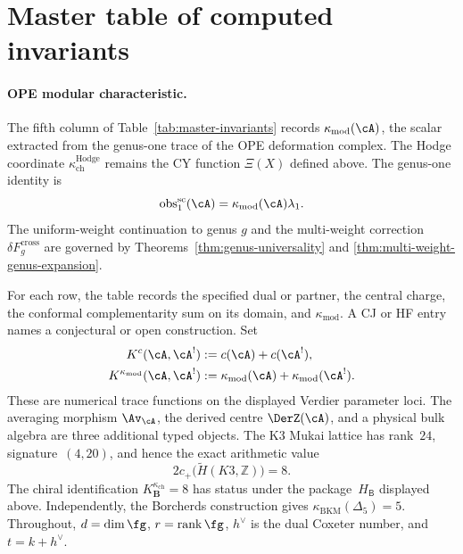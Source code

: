 \section*{Master table of computed invariants}
\label{sec:master-table}

\paragraph{OPE modular characteristic.}
The fifth column of Table~\ref{tab:master-invariants} records
\(\kappa_{\mathrm{mod}}(\cA)\), the scalar extracted from the
genus-one trace of the OPE deformation complex.  The Hodge coordinate
\(\kappa_{\mathrm{ch}}^{\mathrm{Hodge}}\) remains the CY function
\(\Xi(X)\) defined above.  The genus-one identity is
\[
\operatorname{obs}^{\mathrm{sc}}_1(\cA)
=\kappa_{\mathrm{mod}}(\cA)\lambda_1.
\]
The uniform-weight continuation to genus \(g\) and the multi-weight
correction \(\delta F_g^{\mathrm{cross}}\) are governed by
Theorems~\ref{thm:genus-universality} and
\ref{thm:multi-weight-genus-expansion}.

For each row, the table records the specified dual or partner, the
central charge, the conformal complementarity sum on its domain, and
\(\kappa_{\mathrm{mod}}\).  A CJ or HF entry names a conjectural or
open construction.  Set
\[
\begin{aligned}
K^c(\cA,\cA^!)&:=c(\cA)+c(\cA^!),\\
K^{\kappa_{\mathrm{mod}}}(\cA,\cA^!)
&:=\kappa_{\mathrm{mod}}(\cA)
+\kappa_{\mathrm{mod}}(\cA^!).
\end{aligned}
\]
These are numerical trace functions on the displayed Verdier
parameter loci.  The averaging morphism
\(\Av_\cA\), the derived centre \(\DerZ(\cA)\), and a physical bulk
algebra are three additional typed objects.  The K3 Mukai lattice has
rank~$24$, signature~$(4,20)$, and hence the exact arithmetic value
\[
2c_+\bigl(\widetilde H(K3,\mathbb Z)\bigr)=8.
\]
The chiral identification
$K^{\kappa_{\mathrm{ch}}}_{\mathbf B}=8$ has status
\ClaimStatusConjectured under the package~$H_{\mathsf B}$ displayed
above.  Independently, the Borcherds construction gives
\(\kappa_{\mathrm{BKM}}(\Delta_5)=5\).
Throughout, \(d=\dim\fg\), \(r=\operatorname{rank}\fg\),
\(h^\vee\) is the dual Coxeter number, and \(t=k+h^\vee\).

